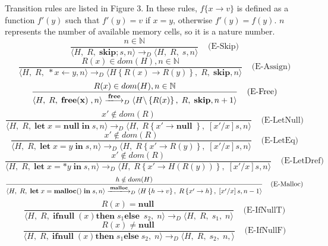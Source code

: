 \documentclass[english]{jssst_ppl} %
\newcommand\LET{\mathbf{let}\;}
\newcommand\FREE{\mathbf{free(x)}\;}
\newcommand\IN{\mathbf{in}\;}
\newcommand\SKIP{\mathbf{skip}}
\newcommand\Rtab{\; \; \; \;}
\newcommand\NULL{\mathbf{null}\;}
\newcommand\IFNULL{\mathbf{ifnull}\;}
\newcommand\THEN{\mathbf{then}\;}
\newcommand\ELSE{\mathbf{else}\;}
\newcommand\Lfc{\left\{}
\newcommand\Rfc{\right\}}
\newcommand\Lb{\left[}
\newcommand\Rb{\right]}
\newcommand\coma{,\;}
\newcommand\Malloc{\mathbf{malloc}}
\newcommand\Free{\mathbf{free}}
\newcommand\Cirx{(x)}
\begin{document}
Transition rules are listed in Figure 3. In these rules, $f\{x\to v\}$ is defined as a function $f'(y)$ such that $f'(y) = v$ if $x = y$, otherwise $f'(y) = f(y)$. $n$ represents the number of available memory cells, so it is a nature number.
$$
    \frac{n \in \mathbb{N}}
            {\langle H\coma R\coma  \SKIP;s , n \rangle
              \longrightarrow_{D}
                \langle H\coma R\coma   s , n \rangle }
     \Rtab \mbox{(E-Skip)}
$$
$$
     \frac{R(x) \in dom(H), n \in \mathbb{N}}
           {\langle H\coma R\coma  *x \leftarrow y , n \rangle
             \longrightarrow_{D}
             \langle H \Lfc R(x) \rightarrow R(y) \Rfc \coma R \coma   \SKIP , n  \rangle }
     \Rtab \mbox{(E-Assign)}
$$
$$
     \frac{R(x) \in dom(H) , n \in \mathbb{N}}
          {\langle H\coma R\coma  \FREE , n \rangle
            \xlongrightarrow{\Free}_{D}
            \langle H\backslash \Lfc R(x) \Rfc \coma R \coma   \SKIP , n+1  \rangle }
     \Rtab \mbox{(E-Free)}
$$
$$
     \frac{x' \notin dom(R)}
           {\langle H\coma R\coma  \LET x = \NULL \IN s , n \rangle
             \longrightarrow_{D}
             \langle H\coma R\Lfc x' \rightarrow \NULL \Rfc \coma   \Lb x'/x \Rb s , n  \rangle }
     \Rtab \mbox{(E-LetNull)}
$$
$$
     \frac{x' \notin dom(R)}
            {\langle H\coma R\coma \LET x = y \; \IN s , n \rangle
              \longrightarrow_{D}
              \langle H\coma R\Lfc x' \rightarrow R(y) \Rfc \coma   \Lb x'/x \Rb s , n  \rangle }
\Rtab \mbox{(E-LetEq)}
$$
$$
     \frac{x' \notin dom(R)}
            {\langle H\coma R\coma  \LET x = *y \; \IN s , n \rangle
              \longrightarrow_{D}
              \langle H\coma R\Lfc x' \rightarrow H(R(y)) \Rfc \coma   \Lb x'/x \Rb s , n  \rangle }
     \Rtab \mbox{(E-LetDref)}
$$
$$
     \frac{h \notin dom(H)}
            {\langle H\coma R\coma  \LET x = \Malloc() \; \IN s , n \rangle
              \xlongrightarrow{\Malloc}_{D}
              \langle H \Lfc h \rightarrow v\Rfc \coma R\Lfc x' \rightarrow h \Rfc \coma   \Lb x'/x \Rb s , n-1  \rangle }
\Rtab \mbox{(E-Malloc)}
$$
$$
    \frac{R(x) = \NULL}
           {\langle H \coma R \coma \IFNULL\Cirx   \THEN   s_{1} \ELSE\  s_{2} \coma  n \rangle
           \longrightarrow_{D}
           \langle H\coma R\coma s_{1} \coma n \rangle}
    \Rtab \mbox{(E-IfNullT)}
$$
$$
    \frac{R(x) \neq \NULL}
           {\langle H \coma R \coma \IFNULL\Cirx \THEN  s_{1} \ELSE  s_{2} \coma  n \rangle
           \longrightarrow_{D}
           \langle H\coma R\coma s_{2} \coma  n, \rangle}
    \Rtab \mbox{(E-IfNullF)}
$$
\end{document}
